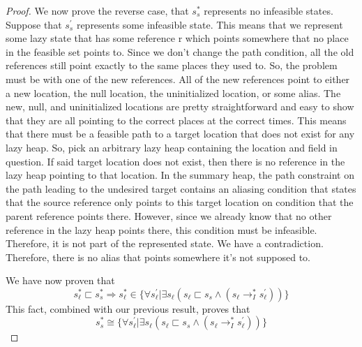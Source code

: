 \begin{proof}
We now prove the reverse case, that $s_s^*$ represents no infeasible states. Suppose that $s_s^\prime$ represents some infeasible state. This means that we represent some lazy state that has some reference r which points somewhere that no place in the feasible set points to. Since we don't change the path condition, all the old references still point exactly to the same places they used to. So, the problem must be with one of the new references. All of the new references point to either a new location, the null location, the uninitialized location, or some alias. The new, null, and uninitialized locations are pretty straightforward and easy to show that they are all pointing to the correct places at the correct times. This means that there must be a feasible path to a target location that does not exist for any lazy heap. So, pick an arbitrary lazy heap containing the location and field in question. If said target location does not exist, then there is no reference in the lazy heap pointing to that location. In the summary heap, the path constraint on the path leading to the undesired target contains an aliasing condition that states that the source reference only points to this target location on condition that the parent reference points there. However, since we already know that no other reference in the lazy heap points there, this condition must be infeasible. Therefore, it is not part of the represented state. We have a contradiction. Therefore, there is no alias that points somewhere it's not supposed to.

We have now proven that 
$$ s_\ell^* \sqsubset s_s^*  \Rightarrow  s_\ell^* \in \{\forall s_\ell^\prime | \exists s_\ell (s_\ell \sqsubset s_s \wedge (s_\ell \rightarrow_I^* s_\ell^\prime) ) \}$$
This fact, combined with our previous result, proves that
$$s_s^*  \cong \{\forall s_\ell^\prime | \exists s_\ell (s_\ell \sqsubset s_s \wedge (s_\ell \rightarrow_I^* s_\ell^\prime) ) \}$$

\end{proof}

